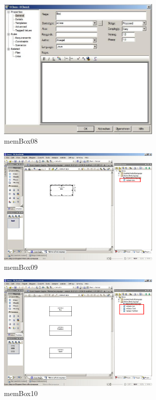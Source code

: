 \begin{figure}[htbp]
	\centering
  \includegraphics[width=0.7\textwidth]{pics/memBox08.png}
	\caption{memBox08}
	\label{memBox08}
\end{figure}

\begin{figure}[htbp]
	\centering
  \includegraphics[width=0.7\textwidth]{pics/memBox09.png}
	\caption{memBox09}
	\label{memBox09}
\end{figure}

\begin{figure}[htbp]
	\centering
  \includegraphics[width=0.7\textwidth]{pics/memBox10.png}
	\caption{memBox10}
	\label{memBox10}
\end{figure}

